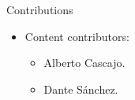 \begin{frame}[t]{Contributions}
\begin{itemize}
  \item Content contributors:
    \begin{itemize}
      \item Alberto Cascajo.
      \item Dante Sánchez.
    \end{itemize}
\end{itemize}
\end{frame}
